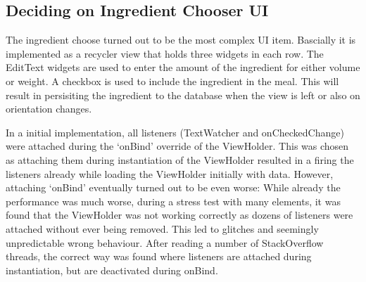 \documentclass[a4paper,11pt,twoside]{article}
\begin{document}
\subsection{Deciding on Ingredient Chooser UI}
The ingredient choose turned out to be the most complex UI item. Bascially it is
implemented as a recycler view that holds three widgets in each row. The EditText
widgets are used to enter the amount of the ingredient for either volume or weight.
A checkbox is used to include the ingredient in the meal. This will result in
persisiting the ingredient to the database when the view is left or also on
orientation changes.

In a initial implementation, all listeners (TextWatcher and onCheckedChange) were
attached during the `onBind' override of the ViewHolder. This was chosen as attaching
them during instantiation of the ViewHolder resulted in a firing the listeners
already while loading the ViewHolder initially with data. However, attaching `onBind'
eventually turned out to be even worse: While already the performance was much worse,
during a stress test with many elements, it was found that the ViewHolder was not
working correctly as dozens of listeners were attached without ever being removed.
This led to glitches and seemingly unpredictable wrong behaviour.
After reading a number of StackOverflow threads, the correct way was found where
listeners are attached during instantiation, but are deactivated during onBind.



\end{document}
